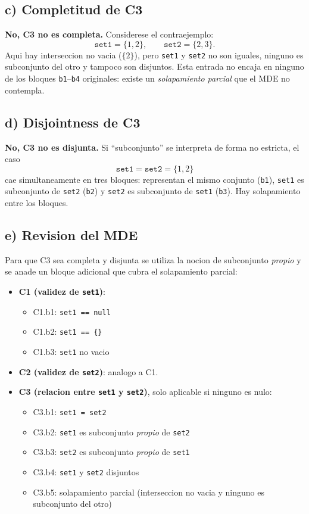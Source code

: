 \documentclass[12pt,a4paper]{article}
\begin{document}
\subsection{c) Completitud de C3}

\textbf{No, C3 no es completa.} Considerese el contraejemplo:
\[
\texttt{set1} = \{1,2\}, \qquad \texttt{set2} = \{2,3\}.
\]
Aqui hay interseccion no vacia (\(\{2\}\)), pero \texttt{set1} y \texttt{set2} no son iguales,
ninguno es subconjunto del otro y tampoco son disjuntos. Esta entrada no encaja en ninguno de los
bloques \texttt{b1}--\texttt{b4} originales: existe un \textit{solapamiento parcial} que el MDE no
contempla.

\subsection{d) Disjointness de C3}

\textbf{No, C3 no es disjunta.} Si ``subconjunto'' se interpreta de forma no estricta, el caso
\[
\texttt{set1} = \texttt{set2} = \{1,2\}
\]
cae simultaneamente en tres bloques: representan el mismo conjunto (\texttt{b1}), \texttt{set1} es
subconjunto de \texttt{set2} (\texttt{b2}) y \texttt{set2} es subconjunto de \texttt{set1}
(\texttt{b3}). Hay solapamiento entre los bloques.

\subsection{e) Revision del MDE}

Para que C3 sea completa y disjunta se utiliza la nocion de subconjunto \textit{propio} y se anade
un bloque adicional que cubra el solapamiento parcial:

\begin{itemize}
  \item \textbf{C1 (validez de \texttt{set1})}:
  \begin{itemize}
    \item C1.b1: \texttt{set1 == null}
    \item C1.b2: \texttt{set1 == \{\}}
    \item C1.b3: \texttt{set1} no vacio
  \end{itemize}
  \item \textbf{C2 (validez de \texttt{set2})}: analogo a C1.
  \item \textbf{C3 (relacion entre \texttt{set1} y \texttt{set2})}, solo aplicable si ninguno es
  nulo:
  \begin{itemize}
    \item C3.b1: \texttt{set1 = set2}
    \item C3.b2: \texttt{set1} es subconjunto \textit{propio} de \texttt{set2}
    \item C3.b3: \texttt{set2} es subconjunto \textit{propio} de \texttt{set1}
    \item C3.b4: \texttt{set1} y \texttt{set2} disjuntos
    \item C3.b5: solapamiento parcial (interseccion no vacia y ninguno es subconjunto del otro)
  \end{itemize}
\end{itemize}
\end{document}
